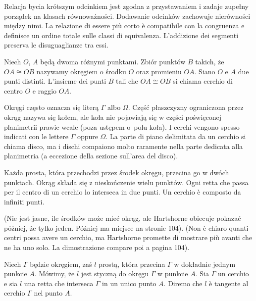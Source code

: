 Relacja bycia krótszym odcinkiem jest zgodna z przystawaniem i zadaje zupełny porządek na klasach równoważności. %
Dodawanie odcinków zachowuje nierówności między nimi. %
La relazione di essere più corto è compatibile con la congruenza e definisce un ordine totale sulle classi di equivalenza. %
L'addizione dei segmenti preserva le disuguaglianze tra essi. %

\begin{definition}
[okrąg] %
[cerchio] %
    Niech $O$, $A$ będą dwoma różnymi punktami. %
    Zbiór punktów $B$ takich, że $OA \cong OB$ nazywamy okręgiem o środku $O$ oraz promieniu $OA$. %
    Siano $O$ e $A$ due punti distinti. %
    L'insieme dei punti $B$ tali che $OA \cong OB$ si chiama cerchio di centro $O$ e raggio $OA$. %
\end{definition}

Okręgi często oznacza się literą $\Gamma$ albo $\Omega$. %
Część płaszczyzny ograniczona przez okrąg nazywa się kołem, ale koła nie pojawiają się w części poświęconej planimetrii prawie wcale (poza ustępem o~polu koła). %
I cerchi vengono spesso indicati con le lettere $\Gamma$ oppure $\Omega$. %
La parte di piano delimitata da un cerchio si chiama disco, ma i dischi compaiono molto raramente nella parte dedicata alla planimetria (a eccezione della sezione sull'area del disco). %

\begin{proposition}
    Każda prosta, która przechodzi przez środek okręgu, przecina go w dwóch punktach. %
    Okrąg składa się z nieskończenie wielu punktów. %
    Ogni retta che passa per il centro di un cerchio lo interseca in due punti. %
    Un cerchio è composto da infiniti punti. %
\end{proposition}

(Nie jest jasne, ile środków może mieć okrąg, ale Hartshorne \cite[s. 89]{hartshorne_2000} obiecuje pokazać póżniej, że tylko jeden. %
Później ma miejsce na stronie 104). %
(Non è chiaro quanti centri possa avere un cerchio, ma Hartshorne \cite[p. 89]{hartshorne_2000} promette di mostrare più avanti che ne ha uno solo. %
La dimostrazione compare poi a pagina 104). %

\begin{definition}
[styczna] %
[tangente] %
    Niech $\Gamma$ będzie okręgiem, zaś $l$ prostą, która przecina $\Gamma$ w dokładnie jednym punkcie $A$. %
    Mówimy, że $l$ jest styczną do okręgu $\Gamma$ w punkcie $A$. %
    Sia $\Gamma$ un cerchio e sia $l$ una retta che interseca $\Gamma$ in un unico punto $A$. %
    Diremo che $l$ è tangente al cerchio $\Gamma$ nel punto $A$. %
\end{definition}

